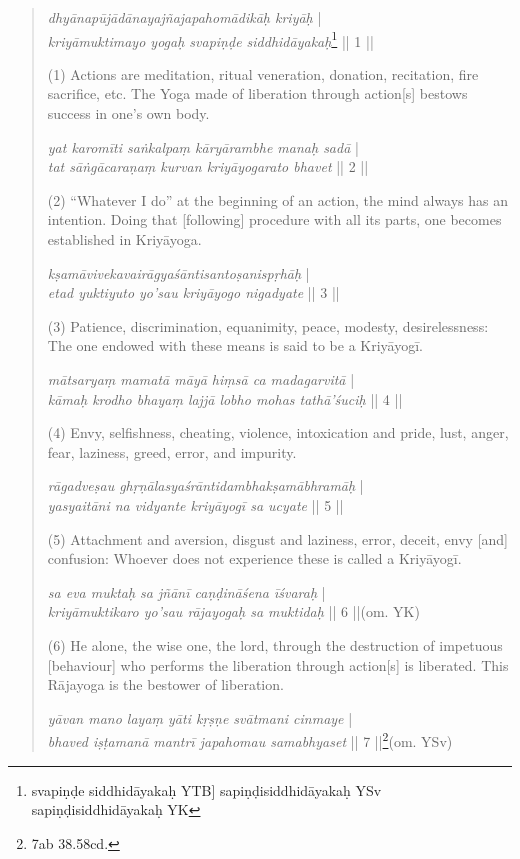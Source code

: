 \begin{quote}
\textit{dhyānapūjādānayajñajapahomādikāḥ kriyāḥ} |\\
\textit{kriyāmuktimayo yogaḥ svapiṇḍe siddhidāyakaḥ}\footnote{svapiṇḍe siddhidāyakaḥ YTB] sapiṇḍisiddhidāyakaḥ YSv sapiṇḍisiddhidāyakaḥ YK} || 1 ||

(1) Actions are meditation, ritual veneration, donation, recitation, fire sacrifice, etc. 
The Yoga made of liberation through action[s] bestows success in one's own body. 

\textit{yat karomīti saṅkalpaṃ kāryārambhe manaḥ sadā} |\\
\textit{tat sāṅgācaraṇaṃ kurvan kriyāyogarato bhavet} || 2 ||

(2) ``Whatever I do'' at the beginning of an action, the mind always has an intention.  
Doing that [following] procedure with all its parts, one becomes established in Kriyāyoga.  

\textit{kṣamāvivekavairāgyaśāntisantoṣanispṛhāḥ} |\\
\textit{etad yuktiyuto yo'sau kriyāyogo nigadyate} || 3 ||

(3) Patience, discrimination, equanimity, peace, modesty, desirelessness:
The one endowed with these means is said to be a Kriyāyogī.

\textit{mātsaryaṃ mamatā māyā hiṃsā ca madagarvitā} |\\
\textit{kāmaḥ krodho bhayaṃ lajjā lobho mohas tathā'śuciḥ} || 4 ||

(4) Envy, selfishness, cheating, violence, intoxication and pride,
lust, anger, fear, laziness, greed, error, and impurity.

\textit{rāgadveṣau ghṛṇālasyaśrāntidambhakṣamābhramāḥ} |\\
\textit{yasyaitāni na vidyante kriyāyogī sa ucyate} || 5 ||

(5) Attachment and aversion, disgust and laziness, error, deceit, envy [and] confusion:
Whoever does not experience these is called a Kriyāyogī.

\textit{sa eva muktaḥ sa jñānī caṇḍināśena īśvaraḥ} |\\
\textit{kriyāmuktikaro yo'sau rājayogaḥ sa muktidaḥ} || 6 ||(om. YK)

(6) He alone, the wise one, the lord, through the destruction of impetuous [behaviour]
who performs the liberation through action[s] is liberated. This Rājayoga is the bestower of liberation.

\textit{yāvan mano layaṃ yāti kṛṣṇe svātmani cinmaye} | \\ 
\textit{bhaved iṣṭamanā mantrī japahomau samabhyaset} || 7 ||\footnote{7ab \approx {} 38.58cd.}(om. YSv) 


\end{quote}
